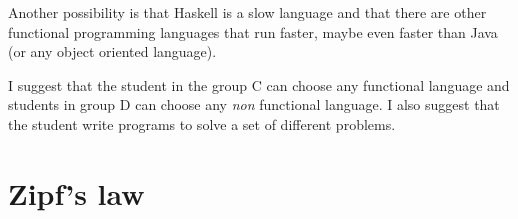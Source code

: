 \documentclass[11pt, a4paper]{article}
\begin{document}
Another possibility is that Haskell is a slow language and that there are other functional programming languages that run faster,
maybe even faster than Java (or any object oriented language).

I suggest that the student in the group C can choose any functional language and students in group D can choose any \textit{non}
functional language. I also suggest that the student write programs to solve a set of different problems.

\section{Zipf's law}

\begin{figure}[h]
	
\end{figure}



\end{document}
